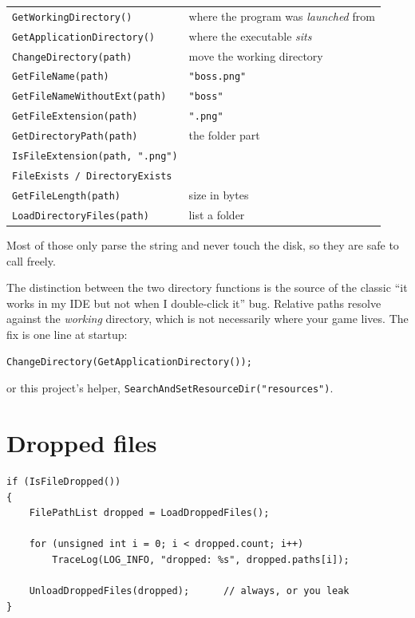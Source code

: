 \begin{center}
\begin{tabular}{@{}ll@{}}
\toprule
\lstinline|GetWorkingDirectory()| & where the program was \emph{launched} from \\
\lstinline|GetApplicationDirectory()| & where the executable \emph{sits} \\
\lstinline|ChangeDirectory(path)| & move the working directory \\
\lstinline|GetFileName(path)| & \lstinline|"boss.png"| \\
\lstinline|GetFileNameWithoutExt(path)| & \lstinline|"boss"| \\
\lstinline|GetFileExtension(path)| & \lstinline|".png"| \\
\lstinline|GetDirectoryPath(path)| & the folder part \\
\lstinline|IsFileExtension(path, ".png")| & \\
\lstinline|FileExists / DirectoryExists| & \\
\lstinline|GetFileLength(path)| & size in bytes \\
\lstinline|LoadDirectoryFiles(path)| & list a folder \\
\bottomrule
\end{tabular}
\end{center}

Most of those only parse the string and never touch the disk, so they are safe to
call freely.

The distinction between the two directory functions is the source of the classic
``it works in my IDE but not when I double-click it'' bug. Relative paths resolve
against the \emph{working} directory, which is not necessarily where your game
lives. The fix is one line at startup:

\begin{lstlisting}
ChangeDirectory(GetApplicationDirectory());
\end{lstlisting}

or this project's helper, \lstinline|SearchAndSetResourceDir("resources")|.

\section{Dropped files}

\begin{lstlisting}
if (IsFileDropped())
{
    FilePathList dropped = LoadDroppedFiles();

    for (unsigned int i = 0; i < dropped.count; i++)
        TraceLog(LOG_INFO, "dropped: %s", dropped.paths[i]);

    UnloadDroppedFiles(dropped);      // always, or you leak
}
\end{lstlisting}

